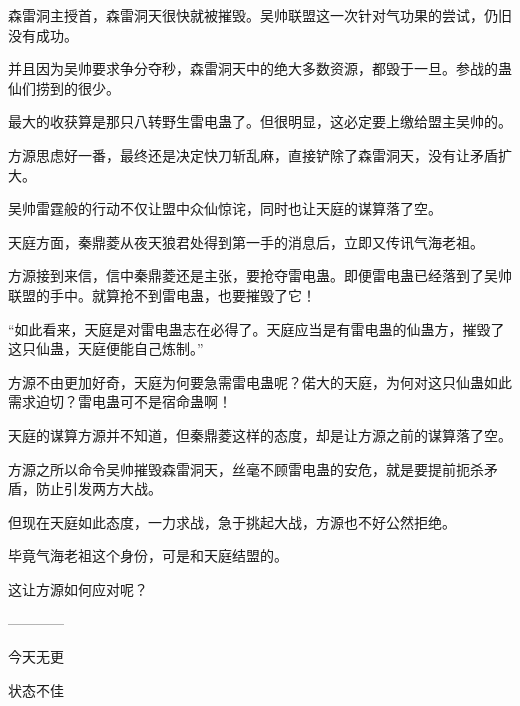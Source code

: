 \begin{this_body}
森雷洞主授首，森雷洞天很快就被摧毁。吴帅联盟这一次针对气功果的尝试，仍旧没有成功。

并且因为吴帅要求争分夺秒，森雷洞天中的绝大多数资源，都毁于一旦。参战的蛊仙们捞到的很少。

最大的收获算是那只八转野生雷电蛊了。但很明显，这必定要上缴给盟主吴帅的。

方源思虑好一番，最终还是决定快刀斩乱麻，直接铲除了森雷洞天，没有让矛盾扩大。

吴帅雷霆般的行动不仅让盟中众仙惊诧，同时也让天庭的谋算落了空。

天庭方面，秦鼎菱从夜天狼君处得到第一手的消息后，立即又传讯气海老祖。

方源接到来信，信中秦鼎菱还是主张，要抢夺雷电蛊。即便雷电蛊已经落到了吴帅联盟的手中。就算抢不到雷电蛊，也要摧毁了它！

“如此看来，天庭是对雷电蛊志在必得了。天庭应当是有雷电蛊的仙蛊方，摧毁了这只仙蛊，天庭便能自己炼制。”

方源不由更加好奇，天庭为何要急需雷电蛊呢？偌大的天庭，为何对这只仙蛊如此需求迫切？雷电蛊可不是宿命蛊啊！

天庭的谋算方源并不知道，但秦鼎菱这样的态度，却是让方源之前的谋算落了空。

方源之所以命令吴帅摧毁森雷洞天，丝毫不顾雷电蛊的安危，就是要提前扼杀矛盾，防止引发两方大战。

但现在天庭如此态度，一力求战，急于挑起大战，方源也不好公然拒绝。

毕竟气海老祖这个身份，可是和天庭结盟的。

这让方源如何应对呢？

------------

今天无更

状态不佳

\end{this_body}

